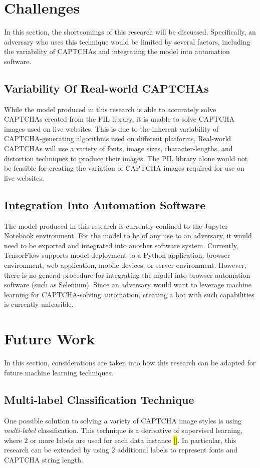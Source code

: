 \documentclass[11pt,conference]{IEEEtran}
\begin{document}
\section{Challenges}
In this section, the shortcomings of this research will be discussed.
Specifically, an adversary who uses this technique would be limited by several
factors, including the variability of CAPTCHAs and integrating the model into
automation software.

\subsection{Variability Of Real-world CAPTCHAs}
While the model produced in this research is able to accurately solve CAPTCHAs created
from the PIL library, it is unable to solve CAPTCHA images
used on live websites. This is due to the inherent variability of
CAPTCHA-generating algorithms used on different platforms. Real-world CAPTCHAs
will use a variety of fonts, image sizes, character-lengths, and distortion
techniques to produce their images. The PIL library alone would not be feasible 
for creating the variation of CAPTCHA images required for use on live websites.

\subsection{Integration Into Automation Software}
The model produced in this research is currently confined to the Jupyter
Notebook environment. For the model to be of any use to an adversary, it would
need to be exported and integrated into another software system. Currently,
TensorFlow supports model deployment to a Python application,
browser environment, web application, mobile devices, or server environment.
However, there is no general procedure for integrating the model into
browser automation software (such as Selenium). Since an adversary would want
to leverage machine learning for CAPTCHA-solving automation, creating a bot
with such capabilities is currently unfeasible.

\section{Future Work}
In this section, considerations are taken into how this research can be adapted
for future machine learning techniques.

\subsection{Multi-label Classification Technique}
One possible solution to solving a variety of CAPTCHA image styles is using 
\emph{multi-label} classification. This technique is a derivative of supervised
learning, where 2 or more labels are used for each data instance \hl{[]}. In
particular, this research can be extended by using 2 additional labels to
represent fonts and CAPTCHA string length.
\end{document}
